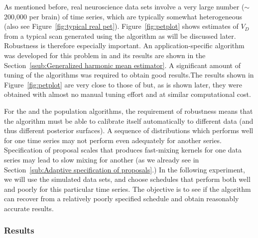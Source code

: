 As mentioned before, real neuroscience data sets involve a very large number
($\sim$200,000 per brain) of time series, which are typically somewhat
heterogeneous (also see Figure~\ref{fig:typical real pet}).
Figure~\ref{fig:petplot} shows estimates of $V_D$ from a typical \pet scan
generated using the \smc[2] algorithm as will be discussed later. Robustness
is therefore especially important. An application-specific \mcmc algorithm was
developed for this problem in \cite{Zhou2013} and its results are shown in the
Section~\ref{ssub:Generalized harmonic mean estimator}. A significant amount
of tuning of the algorithms was required to obtain good results.The results
shown in Figure~\ref{fig:petplot} are very close to those of \cite{Zhou2013}
but, as is shown later, they were obtained with almost no manual tuning effort
and at similar computational cost.

For the \smc and the population \mcmc algorithms, the requirement of
robustness means that the algorithm must be able to calibrate itself
automatically to different data (and thus different posterior surfaces). A
sequence of distributions which performs well for one time series may not
perform even adequately for another series. Specification of proposal scales
that produces fast-mixing kernels for one data series may lead to slow mixing
for another (as we already see in Section~\ref{sub:Adaptive specification of
  proposals}.) In the following experiment, we will use the simulated data
sets, and choose schedules that perform both well and poorly for this
particular time series. The objective is to see if the algorithm can recover
from a relatively poorly specified schedule and obtain reasonably accurate
results.

\subsubsection{Results}

